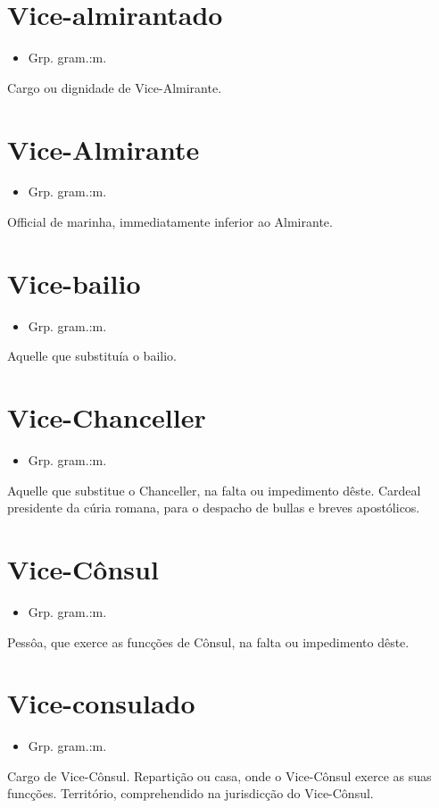 \documentclass{article}
\begin{document}
\section{Vice-almirantado}
\begin{itemize}
\item {Grp. gram.:m.}
\end{itemize}
Cargo ou dignidade de Vice-Almirante.
\section{Vice-Almirante}
\begin{itemize}
\item {Grp. gram.:m.}
\end{itemize}
Official de marinha, immediatamente inferior ao Almirante.
\section{Vice-bailio}
\begin{itemize}
\item {Grp. gram.:m.}
\end{itemize}
Aquelle que substituía o bailio.
\section{Vice-Chanceller}
\begin{itemize}
\item {Grp. gram.:m.}
\end{itemize}
Aquelle que substitue o Chanceller, na falta ou impedimento dêste.
Cardeal presidente da cúria romana, para o despacho de bullas e breves apostólicos.
\section{Vice-Cônsul}
\begin{itemize}
\item {Grp. gram.:m.}
\end{itemize}
Pessôa, que exerce as funcções de Cônsul, na falta ou impedimento dêste.
\section{Vice-consulado}
\begin{itemize}
\item {Grp. gram.:m.}
\end{itemize}
Cargo de Vice-Cônsul.
Repartição ou casa, onde o Vice-Cônsul exerce as suas funcções.
Território, comprehendido na jurisdicção do Vice-Cônsul.
\end{document}
